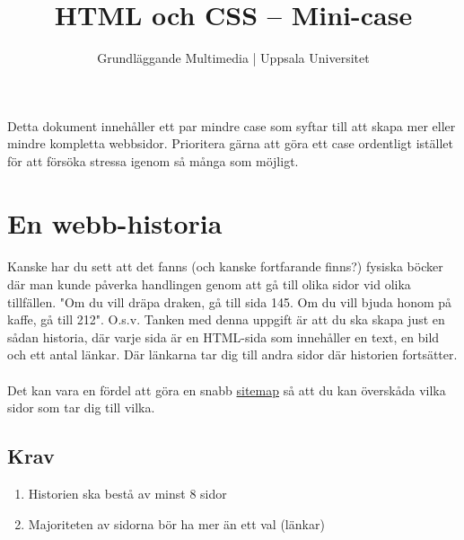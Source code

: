 \documentclass{article}
\begin{document}
  \title{ HTML och CSS -- Mini-case }
  \author{ Grundläggande Multimedia | Uppsala Universitet }
  \date{}
  \maketitle

  \paragraph{}
  Detta dokument innehåller ett par mindre case som syftar till att skapa mer eller mindre kompletta webbsidor. Prioritera gärna att göra ett case ordentligt istället för att försöka stressa igenom så många som möjligt.


  \newpage
  \section{ En webb-historia }
    \paragraph{}
    Kanske har du sett att det fanns (och kanske fortfarande finns?) fysiska böcker där man kunde påverka handlingen genom att gå till olika sidor vid olika tillfällen. "Om du vill dräpa draken, gå till sida 145. Om du vill bjuda honom på kaffe, gå till 212". O.s.v. Tanken med denna uppgift är att du ska skapa just en sådan historia, där varje sida är en HTML-sida som innehåller en text, en bild och ett antal länkar. Där länkarna tar dig till andra sidor där historien fortsätter.
    \paragraph{}
    Det kan vara en fördel att göra en snabb \href{https://www.google.se/search?q=sitemap&um=1&ie=UTF-8&hl=sv&tbm=isch&source=og&sa=N&tab=wi&ei=-QVEUqT6LdD74QT69YHYCg}{sitemap} så att du kan överskåda vilka sidor som tar dig till vilka.

    \subsection*{Krav}
      \begin{enumerate}
        \item Historien ska bestå av minst 8 sidor
        \item Majoriteten av sidorna bör ha mer än ett val (länkar)
      \end{enumerate}
\end{document}
